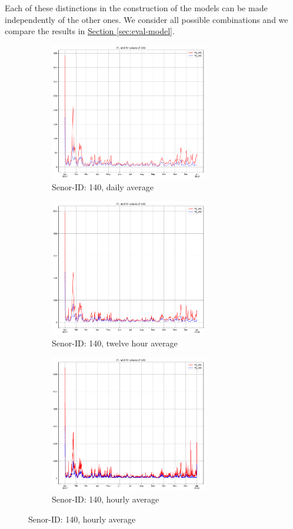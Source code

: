 \documentclass[12pt,a4paper,twoside]{scrartcl}
\numberwithin{equation}{section}
\newcommand{\refsec}[1]{\hyperref[#1]{Section \ref*{#1}}}
\begin{document}
Each of these distinctions in the construction of the models can be made independently of the other ones. We consider all possible combinations and we compare the results in \refsec{sec:eval-model}.
\begin{figure}[H]
  \centering
  \begin{subfigure}[t]{0.32\textwidth}
    \includegraphics[width=\textwidth,height=6cm]{figures/1D_140_plot}%
    \caption{Senor-ID: 140, daily average}
  \end{subfigure}
  \begin{subfigure}[t]{0.32\textwidth}
    \includegraphics[width=\textwidth,height=6cm]{figures/12H_140_plot}%
    \caption{Senor-ID: 140, twelve hour average}
  \end{subfigure}
  \begin{subfigure}[t]{0.32\textwidth}
    \includegraphics[width=\textwidth,height=6cm]{figures/1H_140_plot}%
    \caption{Senor-ID: 140, hourly average}
  \end{subfigure}


\end{figure}
\end{document}
